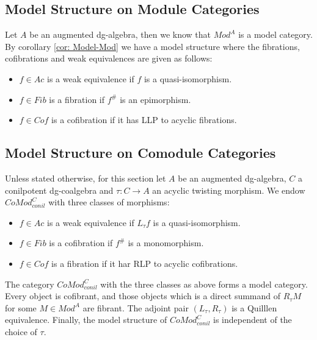 \documentclass[../thesis.tex]{subfiles}
\begin{document}
        \subsection{Model Structure on Module Categories}

            Let $A$ be an augmented dg-algebra, then we know that $Mod^A$ is a model category. By corollary \ref{cor: Model-Mod} we have a model structure where the fibrations, cofibrations and weak equivalences are given as follows:
            \begin{itemize}
                \item $f\in Ac$ is a weak equivalence if $f$ is a quasi-isomorphism.
                \item $f\in Fib$ is a fibration if $f^\#$ is an epimorphism.
                \item $f\in Cof$ is a cofibration if it has LLP to acyclic fibrations. 
            \end{itemize}

        \subsection{Model Structure on Comodule Categories}

            Unless stated otherwise, for this section let $A$ be an augmented dg-algebra, $C$ a conilpotent dg-coalgebra and $\tau : C \rightarrow A$ an acyclic twisting morphism. We endow $CoMod^C_{conil}$ with three classes of morphisms:
            \begin{itemize}
                \item $f\in Ac$ is a weak equivalence if $L_\tau f$ is a quasi-isomorphism.
                \item $f\in Fib$ is a cofibration if $f^\#$ is a monomorphism.
                \item $f\in Cof$ is a fibration if it har RLP to acyclic cofibrations.
            \end{itemize}

            \begin{thm}\label{thm: model-comod}
              The category $CoMod^C_{conil}$ with the three classes as above forms a model category. Every object is cofibrant, and those objects which is a direct summand of $R_\tau M$ for some $M\in Mod^A$ are fibrant. The adjoint pair $(L_\tau, R_\tau)$ is a Quilllen equivalence. Finally, the model structure of $CoMod^C_{conil}$ is independent of the choice of $\tau$.
            \end{thm}
\end{document}
